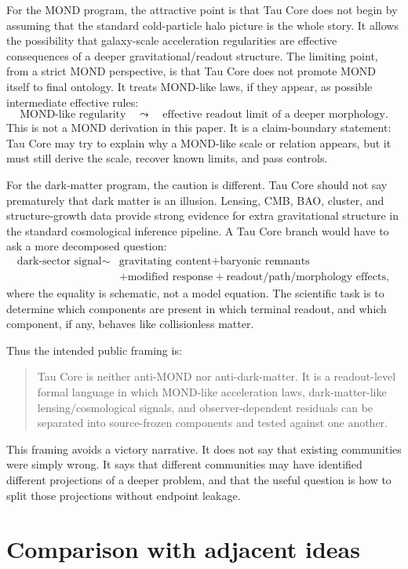 \documentclass[11pt]{article}
\begin{document}
For the MOND program, the attractive point is that Tau Core does not begin by
assuming that the standard cold-particle halo picture is the whole story.  It
allows the possibility that galaxy-scale acceleration regularities are
effective consequences of a deeper gravitational/readout structure.  The
limiting point, from a strict MOND perspective, is that Tau Core does not
promote MOND itself to final ontology.  It treats MOND-like laws, if they
appear, as possible intermediate effective rules:
\[
  \text{MOND-like regularity}
  \quad\leadsto\quad
  \text{effective readout limit of a deeper morphology}.
\]
This is not a MOND derivation in this paper.  It is a claim-boundary statement:
Tau Core may try to explain why a MOND-like scale or relation appears, but it
must still derive the scale, recover known limits, and pass controls.

For the dark-matter program, the caution is different.  Tau Core should not say
prematurely that dark matter is an illusion.  Lensing, CMB, BAO, cluster, and
structure-growth data provide strong evidence for extra gravitational
structure in the standard cosmological inference pipeline.  A Tau Core branch
would have to ask a more decomposed question:
\[
  \begin{aligned}
  \text{dark-sector signal}
  \sim{}&
  \text{gravitating content}
  + \text{baryonic remnants} \\
  &+ \text{modified response}
  + \text{readout/path/morphology effects},
  \end{aligned}
\]
where the equality is schematic, not a model equation.  The scientific task is
to determine which components are present in which terminal readout, and which
component, if any, behaves like collisionless matter.

Thus the intended public framing is:
\begin{quote}
Tau Core is neither anti-MOND nor anti-dark-matter.  It is a readout-level
formal language in which MOND-like acceleration laws, dark-matter-like
lensing/cosmological signals, and observer-dependent residuals can be
separated into source-frozen components and tested against one another.
\end{quote}
This framing avoids a victory narrative.  It does not say that existing
communities were simply wrong.  It says that different communities may have
identified different projections of a deeper problem, and that the useful
question is how to split those projections without endpoint leakage.

\section{Comparison with adjacent ideas}
\end{document}
